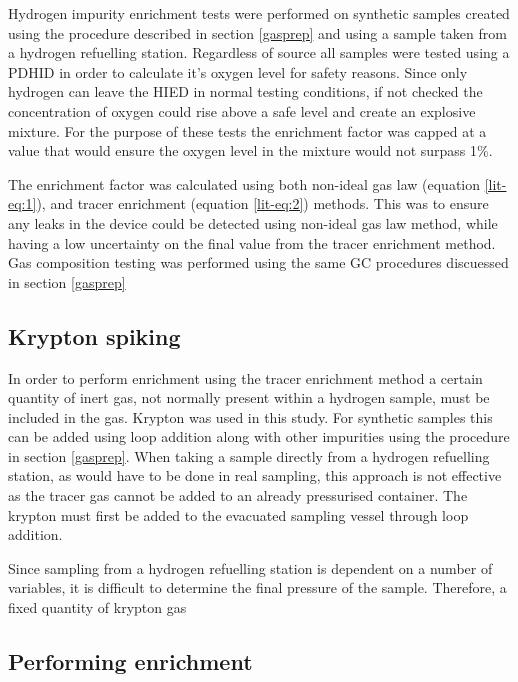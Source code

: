 Hydrogen impurity enrichment tests were performed on synthetic samples created using the procedure described in section \ref{gasprep} and using a sample taken from a hydrogen refuelling station. Regardless of source all samples were tested using a PDHID in order to calculate it's oxygen level for safety reasons. Since only hydrogen can leave the HIED in normal testing conditions, if not checked the concentration of oxygen could rise above a safe level and create an explosive mixture. For the purpose of these tests the enrichment factor was capped at a value that would ensure the oxygen level in the mixture would not surpass 1\%. 

The enrichment factor was calculated using both non-ideal gas law (equation \ref{lit-eq:1}), and tracer enrichment (equation \ref{lit-eq:2}) methods. This was to ensure any leaks in the device could be detected using non-ideal gas law method, while having a low uncertainty on the final value from the tracer enrichment method. Gas composition testing was performed using the same GC procedures discuessed in section \ref{gasprep}
\subsection{Krypton spiking}
In order to perform enrichment using the tracer enrichment method a certain quantity of inert gas, not normally present within a hydrogen sample, must be included in the gas. Krypton was used in this study. For synthetic samples this can be added using loop addition along with other impurities using the procedure in section \ref{gasprep}. When taking a sample directly from a hydrogen refuelling station, as would have to be done in real sampling, this approach is not effective as the tracer gas cannot be added to an already pressurised container. The krypton must first be added to the evacuated sampling vessel through loop addition.

Since sampling from a hydrogen refuelling station is dependent on a number of variables, it is difficult to determine the final pressure of the sample. Therefore, a fixed quantity of krypton gas 
\subsection{Performing enrichment}




\renewcommand{\bibname}{References}

